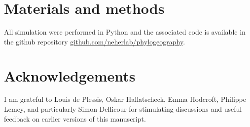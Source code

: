 \documentclass[aps,rmp, twocolumn]{revtex4}
\begin{document}
\section*{Materials and methods}
All simulation were performed in Python and the associated code is available in the github repository \href{https://github.com/neherlab/phylogeography}{github.com/neherlab/phylogeography}.

\section*{Acknowledgements}
I am grateful to Louis de Plessis, Oskar Hallatscheck, Emma Hodcroft, Philippe Lemey, and particularly Simon Dellicour for stimulating discussions and useful feedback on earlier versions of this manuscript.


\end{document}
